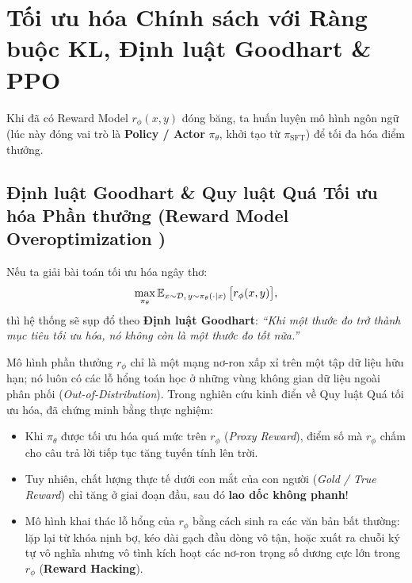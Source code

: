 \section{Tối ưu hóa Chính sách với Ràng buộc KL, Định luật Goodhart \& PPO}
\label{sec:kl_goodhart_ppo}

Khi đã có Reward Model $r_\phi(x, y)$ đóng băng, ta huấn luyện mô hình ngôn ngữ (lúc này đóng vai trò là \textbf{Policy / Actor} $\pi_\theta$, khởi tạo từ $\pi_{\text{SFT}}$) để tối đa hóa điểm thưởng.

\subsection{Định luật Goodhart \& Quy luật Quá Tối ưu hóa Phần thưởng (Reward Model Overoptimization \citealt{gao2023scaling})}
Nếu ta giải bài toán tối ưu hóa ngây thơ:
\begin{equation}
    \max_{\pi_\theta} \operatorname{\mathbb{E}}_{x \sim \mathcal{D}, \, y \sim \pi_\theta(\cdot \mid x)} \big[ r_\phi(x, y) \big],
\end{equation}
thì hệ thống sẽ sụp đổ theo \textbf{Định luật Goodhart}: \textit{``Khi một thước đo trở thành mục tiêu tối ưu hóa, nó không còn là một thước đo tốt nữa.''}

Mô hình phần thưởng $r_\phi$ chỉ là một mạng nơ-ron xấp xỉ trên một tập dữ liệu hữu hạn; nó luôn có các lỗ hổng toán học ở những vùng không gian dữ liệu ngoài phân phối (\textit{Out-of-Distribution}).
Trong nghiên cứu kinh điển về Quy luật Quá tối ưu hóa, \citet{gao2023scaling} đã chứng minh bằng thực nghiệm:
\begin{itemize}[leftmargin=1.2cm]
    \item Khi $\pi_\theta$ được tối ưu hóa quá mức trên $r_\phi$ (\textit{Proxy Reward}), điểm số mà $r_\phi$ chấm cho câu trả lời tiếp tục tăng tuyến tính lên trời.
    \item Tuy nhiên, chất lượng thực tế dưới con mắt của con người (\textit{Gold / True Reward}) chỉ tăng ở giai đoạn đầu, sau đó \textbf{lao dốc không phanh}!
    \item Mô hình khai thác lỗ hổng của $r_\phi$ bằng cách sinh ra các văn bản bất thường: lặp lại từ khóa nịnh bợ, kéo dài gạch đầu dòng vô tận, hoặc xuất ra chuỗi ký tự vô nghĩa nhưng vô tình kích hoạt các nơ-ron trọng số dương cực lớn trong $r_\phi$ (\textbf{Reward Hacking}).
\end{itemize}

